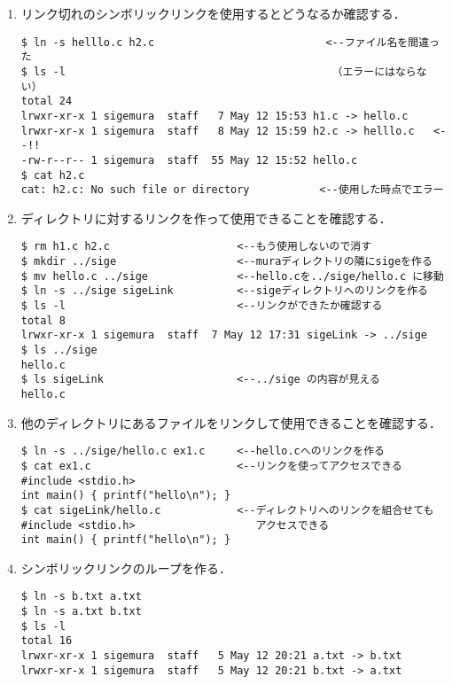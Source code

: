 \documentclass[a4j,twcolumn,11pt,nomag]{ltjarticle}      %
\begin{document}
\begin{enumerate}
\begin{enumerate}
\item リンク切れのシンボリックリンクを使用するとどうなるか確認する．

\begin{lstlisting}[numbers=none]
$ ln -s helllo.c h2.c                           <--ファイル名を間違った
$ ls -l                                          （エラーにはならない）
total 24
lrwxr-xr-x 1 sigemura  staff   7 May 12 15:53 h1.c -> hello.c
lrwxr-xr-x 1 sigemura  staff   8 May 12 15:59 h2.c -> helllo.c   <--!!
-rw-r--r-- 1 sigemura  staff  55 May 12 15:52 hello.c
$ cat h2.c
cat: h2.c: No such file or directory           <--使用した時点でエラー
\end{lstlisting}

\item ディレクトリに対するリンクを作って使用できることを確認する．

\begin{lstlisting}[numbers=none]
$ rm h1.c h2.c                    <--もう使用しないので消す
$ mkdir ../sige                   <--muraディレクトリの隣にsigeを作る
$ mv hello.c ../sige              <--hello.cを../sige/hello.c に移動
$ ln -s ../sige sigeLink          <--sigeディレクトリへのリンクを作る
$ ls -l                           <--リンクができたか確認する
total 8
lrwxr-xr-x 1 sigemura  staff  7 May 12 17:31 sigeLink -> ../sige
$ ls ../sige
hello.c
$ ls sigeLink                     <--../sige の内容が見える
hello.c
\end{lstlisting}

\item 他のディレクトリにあるファイルをリンクして使用できることを確認する．

\begin{lstlisting}[numbers=none]
$ ln -s ../sige/hello.c ex1.c     <--hello.cへのリンクを作る
$ cat ex1.c                       <--リンクを使ってアクセスできる
#include <stdio.h>
int main() { printf("hello\n"); }
$ cat sigeLink/hello.c            <--ディレクトリへのリンクを組合せても
#include <stdio.h>                   アクセスできる
int main() { printf("hello\n"); }
\end{lstlisting}

\item シンボリックリンクのループを作る．
\begin{lstlisting}[numbers=none]
$ ln -s b.txt a.txt
$ ln -s a.txt b.txt
$ ls -l
total 16
lrwxr-xr-x 1 sigemura  staff   5 May 12 20:21 a.txt -> b.txt
lrwxr-xr-x 1 sigemura  staff   5 May 12 20:21 b.txt -> a.txt
\end{lstlisting}


\end{enumerate}
\end{enumerate}
\end{document}
